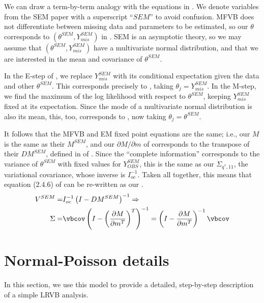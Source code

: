 We can draw a term-by-term analogy with
the equations in \cite{meng:1991:using}. We denote variables
from the SEM paper with a superscript ``$SEM$'' to avoid confusion.
MFVB does not differentiate between missing
data and parameters to be estimated, so our $\theta$ corresponds to
$(\theta^{SEM}, Y_{mis}^{SEM})$ in \cite{meng:1991:using}.
SEM is an asymptotic
theory, so we may assume that $(\theta^{SEM}, Y_{mis}^{SEM})$ have a
multivariate normal
distribution, and that we are interested in the mean and covariance of
$\theta^{SEM}$.

In the E-step of \cite{meng:1991:using}, we replace $Y_{mis}^{SEM}$ with
its conditional expectation given the data and other $\theta^{SEM}$.
This corresponds precisely to , taking
$\theta_j = Y_{mis}^{SEM}$.  In the M-step, we find the maximum
of the log likelihood with respect to $\theta^{SEM}$, keeping
$Y_{mis}^{SEM}$ fixed at its expectation.  Since the mode
of a multivariate normal distribution is also its mean,
this, too, corresponds to , now taking
$\theta_j = \theta^{SEM}$.

It follows that the MFVB and EM fixed point equations are the same;
i.e., our $M$ is the same as their $M^{SEM}$, and
our $\partial M / \partial m$ of  corresponds
to the transpose of their $DM^{SEM}$, defined in 
of \cite{meng:1991:using}.  Since the ``complete information'' corresponds to
the variance of $\theta^{SEM}$ with fixed values for $Y_{OBS}^{SEM}$,
this is the same as our $\Sigma_{q^*,11}$, the variational covariance,
whose inverse is $I_{oc}^{-1}$.  Taken all together, this means that
equation (2.4.6) of \cite{meng:1991:using} can be
re-written as our .
%
\begin{align*}
V^{SEM} =& I_{oc}^{-1} \left(I - DM^{SEM}\right)^{-1} \Rightarrow\\
\Sigma =& \vbcov \left(I - \left(\frac{\partial M}{\partial m^T}\right)^T \right)^{-1}
       = \left(I - \frac{\partial M}{\partial m^T} \right)^{-1} \vbcov
\end{align*}

\section{Normal-Poisson details} \label{app:np_details}

In this section, we use this model to provide a detailed, step-by-step description of
a simple LRVB analysis.

